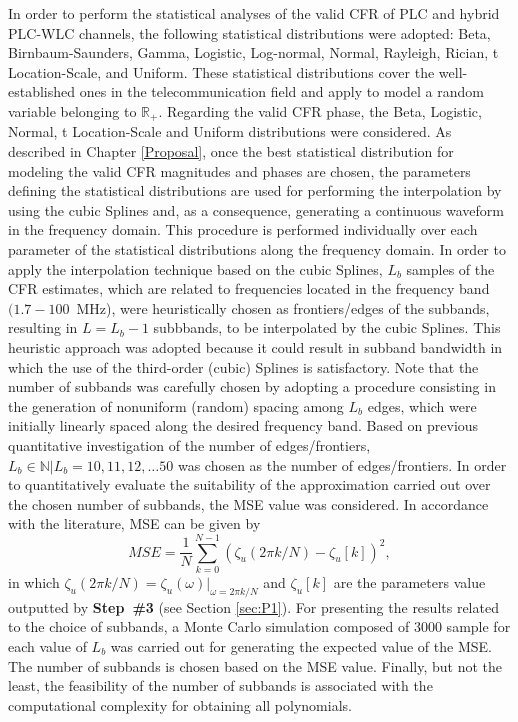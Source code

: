 In order to perform the statistical analyses of the valid \ac{CFR} of \ac{PLC} and hybrid \ac{PLC}-\ac{WLC} channels, the following statistical distributions were adopted: Beta, Birnbaum-Saunders, Gamma, Logistic, Log-normal, Normal, Rayleigh, Rician, t Location-Scale, and Uniform. These statistical distributions cover the well-established ones in the telecommunication field and apply to model a random variable belonging to $\mathbb{R}_+$. Regarding the valid \ac{CFR} phase, the Beta, Logistic, Normal, t Location-Scale and Uniform distributions were considered. As described in Chapter \ref{Proposal}, once the best statistical distribution for modeling the valid \ac{CFR} magnitudes and phases are chosen, the parameters defining the statistical distributions are used for performing the interpolation by using the cubic Splines and, as a consequence, generating a continuous waveform in the frequency domain. This procedure is performed individually over each parameter of the statistical distributions along the frequency domain. In order to apply the interpolation technique based on the cubic Splines, $L_b$ samples of the \ac{CFR} estimates, which are related to frequencies located in the frequency band $(1.7-100$~MHz), were heuristically chosen as frontiers/edges of the subbands, resulting in $L=L_b-1$ subbbands, to be interpolated by the cubic Splines. This heuristic approach was adopted because it could result in subband bandwidth in which the use of the third-order (cubic) Splines is satisfactory. Note that the number of subbands was carefully chosen by adopting a procedure consisting in the generation of nonuniform (random) spacing among $L_b$ edges, which were initially linearly spaced along the desired frequency band. Based on previous quantitative investigation of the number of edges/frontiers, $L_b \in \mathbb{N}|L_b= 10, 11, 12, \ldots 50$ was chosen as the number of edges/frontiers. In order to quantitatively evaluate the suitability of the approximation carried out over the chosen number of subbands, the \ac{MSE} value was considered. In accordance with the literature, \ac{MSE} can be given by
\begin{equation}
MSE=\dfrac{1}{N}\sum\limits_{k=0}^{N-1} ( \zeta_{u}(2\pi k/N)- \zeta_{u}[k])^2,
\end{equation}
in which $\zeta_{u}(2\pi k/N) = \zeta_{u}(\omega)|_{\omega = 2\pi k/N}$ and $\zeta_{u}[k]$ are the parameters value outputted by \textbf{Step~\#3} (see Section \ref{sec:P1}). For presenting the results related to the choice of subbands, a Monte Carlo simulation composed of $3000$ sample for each value of $L_b$ was carried out for generating the expected value of the \ac{MSE}.  The number of subbands is chosen based on the \ac{MSE} value. Finally, but not the least, the feasibility of the number of subbands is associated with the computational complexity for obtaining all polynomials.

